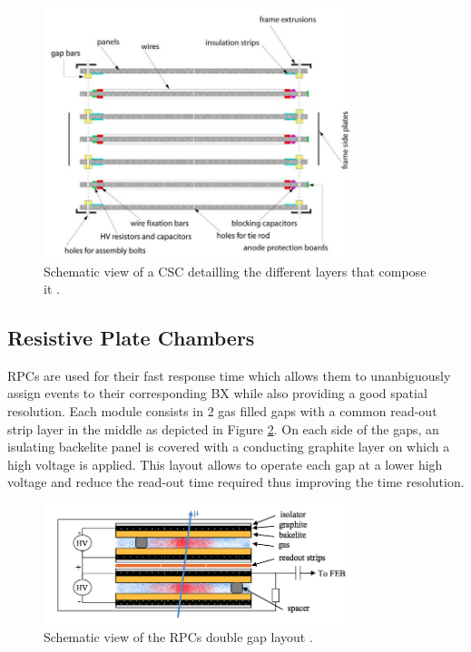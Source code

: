       \begin{figure}[h!]
        \centering
        \includegraphics[width=0.8\textwidth]{img/I-3-cms/csc.png}
        \caption{Schematic view of a CSC detailling the different layers that compose it \cite{1748-0221-3-08-S08004}.}
        \label{fig:I-3-csc}
      \end{figure}

  	\subsection{Resistive Plate Chambers}

      RPCs are used for their fast response time which allows them to unanbiguously assign events to their corresponding BX while also providing a good spatial resolution. Each module consists in 2 gas filled gaps with a common read-out strip layer in the middle as depicted in Figure \ref{fig:I-3-rpc}. On each side of the gaps, an isulating backelite panel is covered with a conducting graphite layer on which a high voltage is applied. This layout allows to operate each gap at a lower high voltage and reduce the read-out time required thus improving the time resolution. \\

      \begin{figure}[h!]
        \centering
        \includegraphics[width=0.8\textwidth]{img/I-3-cms/rpc.png}
        \caption{Schematic view of the RPCs double gap layout \cite{1748-0221-3-08-S08004}.}
        \label{fig:I-3-rpc}
      \end{figure}

